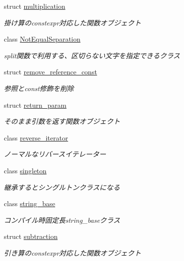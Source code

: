 \begin{DoxyCompactItemize}
struct \mbox{\hyperlink{structsaki_1_1multiplication}{multiplication}}
\begin{DoxyCompactList}\small\item\em 掛け算のconstexpr対応した関数オブジェクト \end{DoxyCompactList}\item 
class \mbox{\hyperlink{classsaki_1_1_not_equal_separation}{Not\+Equal\+Separation}}
\begin{DoxyCompactList}\small\item\em split関数で利用する、区切らない文字を指定できるクラス \end{DoxyCompactList}\item 
struct \mbox{\hyperlink{structsaki_1_1remove__reference__const}{remove\+\_\+reference\+\_\+const}}
\begin{DoxyCompactList}\small\item\em 参照とconst修飾を削除 \end{DoxyCompactList}\item 
struct \mbox{\hyperlink{structsaki_1_1return__param}{return\+\_\+param}}
\begin{DoxyCompactList}\small\item\em そのまま引数を返す関数オブジェクト \end{DoxyCompactList}\item 
class \mbox{\hyperlink{classsaki_1_1reverse__iterator}{reverse\+\_\+iterator}}
\begin{DoxyCompactList}\small\item\em ノーマルなリバースイテレーター \end{DoxyCompactList}\item 
class \mbox{\hyperlink{classsaki_1_1singleton}{singleton}}
\begin{DoxyCompactList}\small\item\em 継承するとシングルトンクラスになる \end{DoxyCompactList}\item 
class \mbox{\hyperlink{classsaki_1_1string__base}{string\+\_\+base}}
\begin{DoxyCompactList}\small\item\em コンパイル時固定長string\+\_\+baseクラス \end{DoxyCompactList}\item 
struct \mbox{\hyperlink{structsaki_1_1subtraction}{subtraction}}
\begin{DoxyCompactList}\small\item\em 引き算のconstexpr対応した関数オブジェクト \end{DoxyCompactList}\item 

\end{DoxyCompactItemize}
